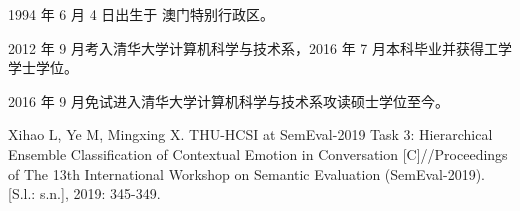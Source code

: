 \begin{resume}


  1994 年 6 月 4 日出生于 澳门特别行政区。

  2012 年 9 月考入清华大学计算机科学与技术系，2016 年 7 月本科毕业并获得工学学士学位。

  2016 年 9 月免试进入清华大学计算机科学与技术系攻读硕士学位至今。



  \begin{publications}[before=\publicationskip,after=\publicationskip]

    \item Xihao L, Ye M, Mingxing X. THU-HCSI at SemEval-2019 Task 3: Hierarchical Ensemble Classification of Contextual Emotion in Conversation [C]//Proceedings of The 13th International Workshop on Semantic Evaluation (SemEval-2019). [S.l.: s.n.], 2019: 345-349.

  \end{publications}



\end{resume}
